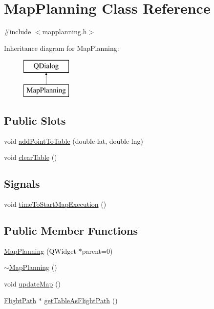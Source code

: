 \hypertarget{class_map_planning}{}\section{Map\+Planning Class Reference}
\label{class_map_planning}


{\ttfamily \#include $<$mapplanning.\+h$>$}

Inheritance diagram for Map\+Planning\+:\begin{figure}[H]
\begin{center}
\leavevmode
\includegraphics[height=2.000000cm]{class_map_planning}
\end{center}
\end{figure}
\subsection*{Public Slots}
\begin{DoxyCompactItemize}
\item 
void \hyperlink{class_map_planning_af2068f7c19c1f495debe4c4e745c99d4}{add\+Point\+To\+Table} (double lat, double lng)
\item 
void \hyperlink{class_map_planning_a320e452b516fbad57bb4a2a6138832c8}{clear\+Table} ()
\end{DoxyCompactItemize}
\subsection*{Signals}
\begin{DoxyCompactItemize}
\item 
void \hyperlink{class_map_planning_a700eb0065441bec199a2a3fc343d0571}{time\+To\+Start\+Map\+Execution} ()
\end{DoxyCompactItemize}
\subsection*{Public Member Functions}
\begin{DoxyCompactItemize}
\item 
\hyperlink{class_map_planning_a02df54932a2eeeb02ca68ee9de8f4e83}{Map\+Planning} (Q\+Widget $\ast$parent=0)
\item 
\hyperlink{class_map_planning_a676c43e0b605ee019f8cbfe1cb4e38be}{$\sim$\+Map\+Planning} ()
\item 
void \hyperlink{class_map_planning_adbd3f2c13fafaaa335058f7517ee4601}{update\+Map} ()
\item 
\hyperlink{class_flight_path}{Flight\+Path} $\ast$ \hyperlink{class_map_planning_a38f72780859a68815d818b28767c6dfd}{get\+Table\+As\+Flight\+Path} ()
\end{DoxyCompactItemize}
